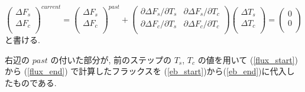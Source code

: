 \begin{equation}
 \left(
\begin{array}{l}
 \Delta F_s \\
 \Delta F_c \\
\end{array}
\right)^{current}
=
\left(
\begin{array}{l}
 \Delta F_s \\
 \Delta F_c \\
\end{array}
\right)^{past}
+
\left(
\begin{array}{ll}
 {\partial \Delta F_s}/{\partial T_s} &
 {\partial \Delta F_s}/{\partial T_c} \\
 {\partial \Delta F_c}/{\partial T_s} &
 {\partial \Delta F_c}/{\partial T_c} \\
\end{array}
\right)
\left(
\begin{array}{l}
 \Delta T_s \\
 \Delta T_c \\
\end{array}
\right)
=
\left(
\begin{array}{l}
 0 \\
 0 \\
\end{array}
\right)
\label{eb1}
\end{equation}
と書ける.

右辺の $past$ の付いた部分が,
前のステップの $T_s$, $T_c$ の値を用いて (\ref{flux_start})から
(\ref{flux_end}) で計算したフラックスを
(\ref{eb_start})から(\ref{eb_end})に代入したものである.

